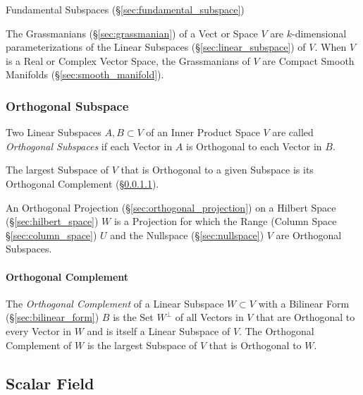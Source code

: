 \fist Fundamental Subspaces (\S\ref{sec:fundamental_subspace})

The Grassmanians (\S\ref{sec:grassmanian}) of a Vect or Space $V$ are
$k$-dimensional parameterizations of the Linear Subspaces
(\S\ref{sec:linear_subspace}) of $V$. When $V$ is a Real or Complex Vector
Space, the Grassmanians of $V$ are Compact Smooth Manifolds
(\S\ref{sec:smooth_manifold}).



\subsubsection{Orthogonal Subspace}\label{sec:orthogonal_subspace}

Two Linear Subspaces $A, B \subset V$ of an Inner Product Space $V$ are called
\emph{Orthogonal Subspaces} if each Vector in $A$ is Orthogonal to each Vector
in $B$.

The largest Subspace of $V$ that is Orthogonal to a given Subspace is its
Orthogonal Complement (\S\ref{sec:orthogonal_complement}).

An Orthogonal Projection (\S\ref{sec:orthogonal_projection}) on a Hilbert Space
(\S\ref{sec:hilbert_space}) $W$ is a Projection for which the Range (Column
Space \S\ref{sec:column_space}) $U$ and the Nullspace (\S\ref{sec:nullspace})
$V$ are Orthogonal Subspaces.



\paragraph{Orthogonal Complement}\label{sec:orthogonal_complement}\hfill

The \emph{Orthogonal Complement} of a Linear Subspace $W \subset V$ with a
Bilinear Form (\S\ref{sec:bilinear_form}) $B$ is the Set $W^\bot$ of all
Vectors in $V$ that are Orthogonal to every Vector in $W$ and is itself a
Linear Subspace of $V$. The Orthogonal Complement of $W$ is the largest
Subspace of $V$ that is Orthogonal to $W$.



\subsection{Scalar Field}\label{sec:scalar_field}


